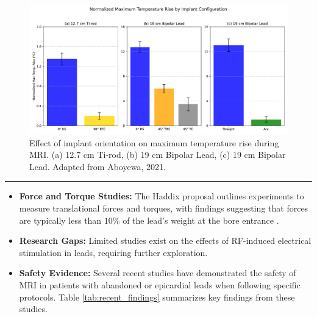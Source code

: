 \documentclass[final]{article}
\newcommand{\posterSection}[1]{
    \noindent{
        \color{DarkBlue}
        \fontsize{50}{60}\bfseries #1
    }
    \vspace{0.5em}
    \hrule
    \vspace{1em}
}
\begin{document}
\begin{multicols}{3}

\begin{figure}[H]
    \centering
    \includegraphics[width=0.9\linewidth]{Figure_4_9_Implant_Configuration_Adjusted_Y.pdf}
    \caption{Effect of implant orientation on maximum temperature rise during MRI. (a) 12.7 cm Ti-rod, (b) 19 cm Bipolar Lead, (c) 19 cm Bipolar Lead. Adapted from Aboyewa, 2021.}
    \label{fig:implant_orientation}
\end{figure}

\posterSection{Recent Advancements}
\begin{itemize}
    \item \textbf{Force and Torque Studies:} The Haddix proposal outlines experiments to measure translational forces and torques, with findings suggesting that forces are typically less than 10\% of the lead's weight at the bore entrance \cite{haddix2022}.
    \item \textbf{Research Gaps:} Limited studies exist on the effects of RF-induced electrical stimulation in leads, requiring further exploration.
    \item \textbf{Safety Evidence:} Several recent studies have demonstrated the safety of MRI in patients with abandoned or epicardial leads when following specific protocols. Table \ref{tab:recent_findings} summarizes key findings from these studies.
\end{itemize}


\end{multicols}
\end{document}
